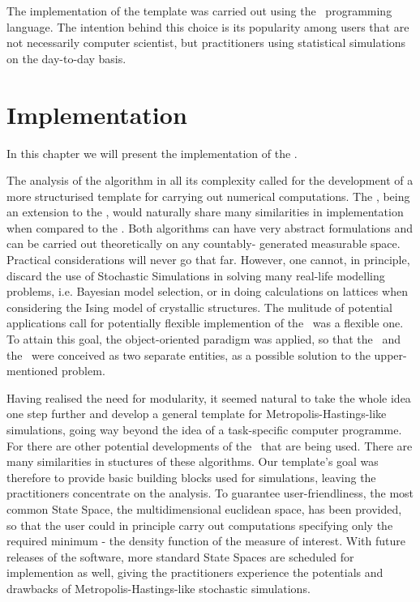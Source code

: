 
The implementation of the template was carried out using the \RR\, programming language. The intention behind this choice is its popularity among users that are not necessarily computer scientist, but practitioners using statistical simulations on the day-to-day basis. 
\chapter{ Implementation }\label{Implementation}

In this chapter we will present the implementation of the \PT. 

The analysis of the algorithm in all its complexity called for the development
of a more structurised template for carrying out numerical computations. The
\PT, being an extension to the \MH, would naturally share many similarities in
implementation when compared to the \PT. Both algorithms can have very
abstract formulations and can be carried out theoretically on any countably-
generated measurable space. Practical considerations will never go that far.
However, one cannot, in principle, discard the use of Stochastic Simulations in solving many real-life modelling problems, i.e. Bayesian model selection, or in doing calculations on lattices when considering the 
Ising model of crystallic structures. The mulitude of potential applications call for potentially flexible implemention of the \PT\, was a flexible one. To attain this goal, the object-oriented paradigm was applied, so that the \sspace\, and the \algo\, were conceived as two separate entities, as a possible
solution to the upper-mentioned problem.

Having realised the need for modularity, it seemed natural to take the whole idea one step further and develop a general template for Metropolis-Hastings-like simulations, going way beyond the idea of a task-specific computer programme. For there are other potential developments of the \MH\, that are being used. There are many similarities in stuctures of these algorithms. Our template's goal was therefore to provide basic building blocks used for simulations, leaving the practitioners concentrate on the analysis. To guarantee user-friendliness, the most common State Space, the multidimensional euclidean space, has been provided, so that the user could in principle carry out computations specifying only the required minimum - the density function of the measure of interest. With future releases of the software, more standard State Spaces are scheduled for implemention as well, giving the practitioners experience the potentials and drawbacks of Metropolis-Hastings-like stochastic simulations.

